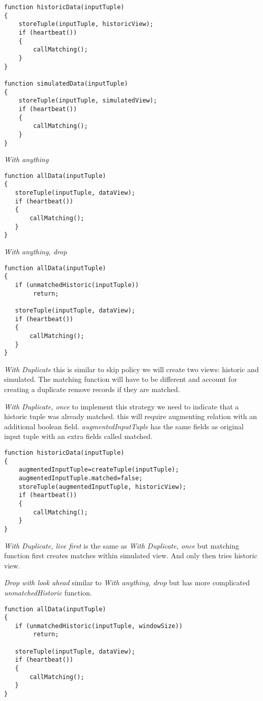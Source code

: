 \documentclass{article}
\begin{document}
\begin{verbatim}   
function historicData(inputTuple)
{
    storeTuple(inputTuple, historicView);
    if (heartbeat())
    {
        callMatching();
    }
}

function simulatedData(inputTuple)
{
    storeTuple(inputTuple, simulatedView);
    if (heartbeat())
    {
        callMatching();
    }
}
\end{verbatim}

\noindent \emph{With anything}
\begin{verbatim}     
function allData(inputTuple)
{
   storeTuple(inputTuple, dataView);
   if (heartbeat())
   {
       callMatching();
   }
}
\end{verbatim}

\noindent \emph{With anything, drop}
\begin{verbatim}     
function allData(inputTuple)
{
   if (unmatchedHistoric(inputTuple))
        return;
    
   storeTuple(inputTuple, dataView);
   if (heartbeat())
   {
       callMatching();
   }
}
\end{verbatim}


\noindent \emph{With Duplicate} this is similar to skip policy we will create two views: historic and simulated. The matching function will have to be different and account for creating a duplicate remove records if they are matched. 

\noindent \emph{With Duplicate, once} to implement this strategy we need to indicate that a historic tuple was already matched. this will require augmenting relation with an additional boolean field. \emph{augmentedInputTuple} has the same fields as original input tuple with an extra fields called matched.

\begin{verbatim}   
function historicData(inputTuple)
{
    augmentedInputTuple=createTuple(inputTuple);
    augmentedInputTuple.matched=false;
    storeTuple(augmentedInputTuple, historicView);
    if (heartbeat())
    {
        callMatching();
    }
}
\end{verbatim}

\noindent \emph{With Duplicate, live first} is the same as \emph{With Duplicate, once} but matching function first creates matches within simulated view. And only then tries historic view.

\noindent \emph{Drop with look ahead} similar to \emph{With anything, drop} but has more complicated \emph{unmatchedHistoric} function.
\begin{verbatim}     
function allData(inputTuple)
{
   if (unmatchedHistoric(inputTuple, windowSize))
        return;
    
   storeTuple(inputTuple, dataView);
   if (heartbeat())
   {
       callMatching();
   }
}
\end{verbatim}
\end{document}
